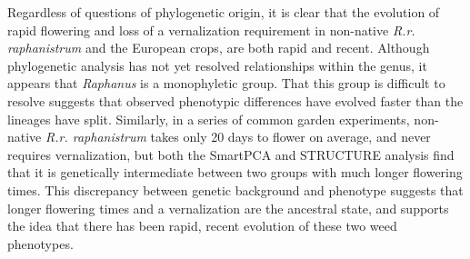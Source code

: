 \documentclass[twocolumn]{bmcart}%
\begin{document}
Regardless of questions of phylogenetic origin, it is clear that the evolution of rapid flowering and loss of a vernalization requirement in non-native \textit{R.r. raphanistrum} and the European crops, are both rapid and recent. Although phylogenetic analysis has not yet resolved relationships within the genus, it appears that \textit{Raphanus} is a monophyletic group. That this group is difficult to resolve suggests that observed phenotypic differences have evolved faster than the lineages have split. Similarly, in a series of common garden experiments, non-native \textit{R.r. raphanistrum} takes only 20 days to flower on average, and never requires vernalization, but both the SmartPCA and STRUCTURE analysis find that it is genetically intermediate between two groups with much longer flowering times. This discrepancy between genetic background and phenotype suggests that longer flowering times and a vernalization are the ancestral state, and supports the idea that there has been rapid, recent evolution of these two weed phenotypes. 
%
%
%



\end{document}
